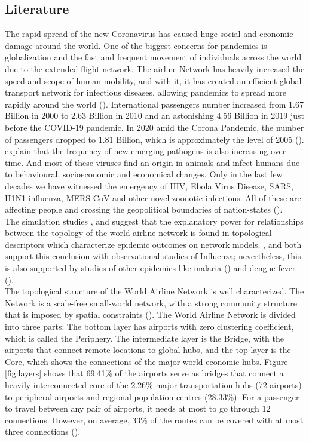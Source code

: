 \documentclass{Template resources/netsci-project}
\begin{document}
\subsection{Literature}
The rapid spread of the new Coronavirus has caused huge social and economic damage around the world. One of the biggest concerns for pandemics is globalization and the fast and frequent movement of individuals across the world due to the extended flight network. The airline Network has heavily increased the speed and scope of human mobility, and with it, it has created an efficient global transport network for infectious diseases, allowing pandemics to spread more rapidly around the world (\cite{Lawyer2016}). International passengers number increased from 1.67 Billion in 2000 to 2.63 Billion in 2010 and an astonishing 4.56 Billion in 2019 just before the COVID-19 pandemic. In 2020 amid the Corona Pandemic, the number of passengers dropped to 1.81 Billion, which is approximately the level of 2005 (\cite{WorldBank}). \\
\cite{Morse2012} explain that the frequency of new emerging pathogens is also increasing over time. And most of these viruses find an origin in animals and infect humans due to behavioural, socioeconomic and economical changes. 
Only in the last few decades we have witnessed the emergency of HIV, Ebola Virus Disease, SARS, H1N1 influenza, MERS-CoV and other novel zoonotic infections. All of these are affecting people and crossing the geopolitical boundaries of nation-states (\cite{MartinBoland2018}).\\
The simulation studies \cite{Colizza2006}, and \cite{Colizza2007} suggest that the explanatory power for relationships between the topology of the world airline network is found in topological descriptors which characterize epidemic outcomes on network models. \cite{Balcan2009}, and \cite{Brockmann2013} both support this conclusion with observational studies of Influenza; nevertheless, this is also supported by studies of other epidemics like malaria (\cite{Hunag2013}) and dengue fever (\cite{Semanza2014}).\\
The topological structure of the World Airline Network is well characterized. The Network is a scale-free small-world network, with a strong community structure that is imposed by spatial constraints (\cite{Lawyer2016, Barrat2005}). The World Airline Network is divided into three parts: The bottom layer has airports with zero clustering coefficient, which is called the Periphery. The intermediate layer is the Bridge, with the airports that connect remote locations to global hubs, and the top layer is the Core, which shows the connections of the major world economic hubs. Figure \ref{fig:layers} shows that 69.41\% of the airports serve as bridges that connect a heavily interconnected core of the 2.26\% major transportation hubs (72 airports) to peripheral airports and regional population centres (28.33\%). For a passenger to travel between any pair of airports, it needs at most to go through 12 connections. However, on average, 33\% of the routes can be covered with at most three connections (\cite{Verma2014}).
\end{document}
